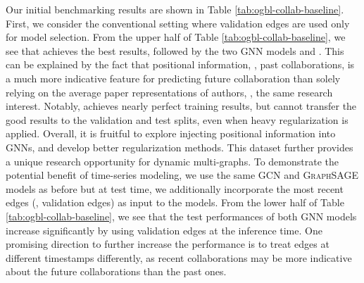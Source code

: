 {Our initial benchmarking results are shown in Table \ref{tab:ogbl-collab-baseline}.
First, we consider the conventional setting where validation edges are used only for model selection.
From the upper half of Table \ref{tab:ogbl-collab-baseline}, we see that  achieves the best results, followed by the two GNN models and .
This can be explained by the fact that positional information, \ie, past collaborations, is a much more indicative feature for predicting future collaboration than solely relying on the average paper representations of authors, \ie, the same research interest.
Notably,  achieves nearly perfect training results, but cannot transfer the good results to the validation and test splits, even when heavy regularization is applied. 
Overall, it is fruitful to explore injecting positional information into GNNs, and develop better regularization methods.
This dataset further provides a unique research opportunity for dynamic multi-graphs.
To demonstrate the potential benefit of time-series modeling, we use the same \textsc{GCN} and \textsc{GraphSAGE} models as before but at test time, we additionally incorporate the most recent edges (\ie, validation edges) as input to the models. From the lower half of Table \ref{tab:ogbl-collab-baseline}, we see that the test performances of both GNN models increase significantly by using validation edges at the inference time.
One promising direction to further increase the performance is to treat edges at different timestamps differently, as recent collaborations may be more indicative about the future collaborations than the past ones.
}


